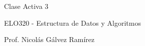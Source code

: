 \documentclass{article}
\begin{document}
\vspace{.5pc}
\centerline{\sc Clase Activa 3}
\centerline{\sc ELO320 - Estructura de Datos y Algoritmos}
\centerline{\sc Prof. Nicolás Gálvez Ramírez}
\vspace{2pc}
\end{document}
